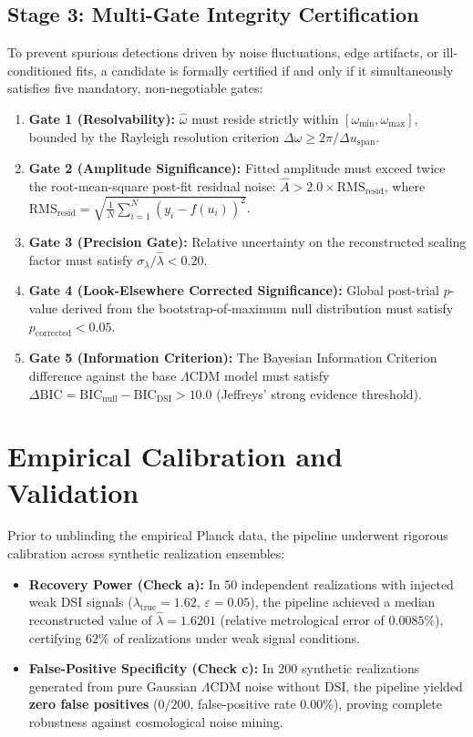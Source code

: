 \documentclass[10pt,twocolumn,a4paper]{article}
\begin{document}
\subsection{Stage 3: Multi-Gate Integrity Certification}
To prevent spurious detections driven by noise fluctuations, edge artifacts, or ill-conditioned fits, a candidate is formally certified if and only if it simultaneously satisfies five mandatory, non-negotiable gates:
\begin{enumerate}
    \item \textbf{Gate 1 (Resolvability):} $\hat\omega$ must reside strictly within $[\omega_{\min}, \omega_{\max}]$, bounded by the Rayleigh resolution criterion $\Delta\omega \ge 2\pi / \Delta u_{\mathrm{span}}$.
    \item \textbf{Gate 2 (Amplitude Significance):} Fitted amplitude must exceed twice the root-mean-square post-fit residual noise: $\hat A > 2.0 \times \mathrm{RMS}_{\mathrm{resid}}$, where $\mathrm{RMS}_{\mathrm{resid}} = \sqrt{\frac{1}{N}\sum_{i=1}^N (y_i - f(u_i))^2}$.
    \item \textbf{Gate 3 (Precision Gate):} Relative uncertainty on the reconstructed scaling factor must satisfy $\sigma_\lambda / \hat\lambda < 0.20$.
    \item \textbf{Gate 4 (Look-Elsewhere Corrected Significance):} Global post-trial $p$-value derived from the bootstrap-of-maximum null distribution must satisfy $p_{\mathrm{corrected}} < 0.05$.
    \item \textbf{Gate 5 (Information Criterion):} The Bayesian Information Criterion difference against the base $\Lambda$CDM model must satisfy $\Delta\mathrm{BIC} = \mathrm{BIC}_{\mathrm{null}} - \mathrm{BIC}_{\mathrm{DSI}} > 10.0$ (Jeffreys' strong evidence threshold).
\end{enumerate}

\section{Empirical Calibration and Validation}
Prior to unblinding the empirical Planck data, the pipeline underwent rigorous calibration across synthetic realization ensembles:
\begin{itemize}
    \item \textbf{Recovery Power (Check a):} In 50 independent realizations with injected weak DSI signals ($\lambda_{\mathrm{true}} = 1.62$, $\varepsilon = 0.05$), the pipeline achieved a median reconstructed value of $\hat\lambda = 1.6201$ (relative metrological error of $0.0085\%$), certifying $62\%$ of realizations under weak signal conditions.
    \item \textbf{False-Positive Specificity (Check c):} In 200 synthetic realizations generated from pure Gaussian $\Lambda$CDM noise without DSI, the pipeline yielded \textbf{zero false positives} ($0/200$, false-positive rate $0.00\%$), proving complete robustness against cosmological noise mining.
\end{itemize}
\end{document}
